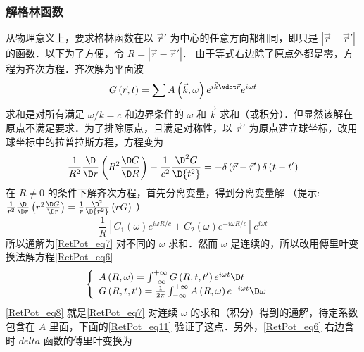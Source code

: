 \subsubsection{解格林函数}  

从物理意义上，要求格林函数在以 $\vec r'$ 为中心的任意方向都相同，即只是 $\left| {\vec r - \vec r'} \right|$ 的函数．以下为了方便，令 $R = \left| {\vec r - \vec r'} \right|$． 
由于等式右边除了原点外都是零，方程为齐次方程．齐次解为平面波
\begin{equation}
G\left( {\vec r,t} \right) = \sum {A\left( {\vec k,\omega } \right){e^{i\vec k \vdot \vec r}}{e^{i\omega t}}} 
\end{equation} 
求和是对所有满足 $\omega /k = c$ 和边界条件的 $\omega$ 和 $\vec k$ 求和（或积分）．但显然该解在原点不满足要求．为了排除原点，且满足对称性，以 $\vec r'$ 为原点建立球坐标，改用球坐标中的拉普拉斯方程，方程变为
\begin{equation}\label{RetPot_eq6}
\frac{1}{{{R^2}}}\frac{\D }{{\D r}}\left( {{R^2}\frac{{\D G}}{{\D R}}} \right) - \frac{1}{{{c^2}}}\frac{{{\D ^2}G}}{{\D {t^2}}} =  - \delta \left( {\vec r - \vec r'} \right)\delta \left( {t - t'} \right)
\end{equation} 
在 $R \ne 0$ 的条件下解齐次方程，首先分离变量，得到分离变量解
（提示: $\frac{1}{{{r^2}}}\frac{\D }{{\D r}}\left( {{r^2}\frac{{\D G}}{{\D r}}} \right) = \frac{1}{r}\frac{{{\D ^2}}}{{\D {r^2}}}\left( {rG} \right)$ ）
\begin{equation}\label{RetPot_eq7}
\frac{1}{R}\left[ {{C_1}\left( \omega  \right){e^{i\omega R/c}} + {C_2}\left( \omega  \right){e^{ - i\omega R/c}}} \right]{e^{i\omega t}}
\end{equation} 
所以通解为\autoref{RetPot_eq7} 对不同的 $\omega$ 求和．然而 $\omega$ 是连续的，所以改用傅里叶变换法解方程\autoref{RetPot_eq6} 
\begin{equation}\label{RetPot_eq8}
\left\{ \begin{array}{l}
A\left( {R,\omega } \right) = \int_{ - \infty }^{ + \infty } {G\left( {R,t,t'} \right){e^{i\omega t}}\D t} {\kern 1pt} {\kern 1pt} {\kern 1pt} {\kern 1pt} {\kern 1pt} {\kern 1pt} {\kern 1pt} {\kern 1pt} \\
G\left( {R,t,t'} \right) = \frac{1}{{2\pi }}\int_{ - \infty }^{ + \infty } {A\left( {R,\omega } \right){e^{ - i\omega t}}\D \omega } {\kern 1pt} {\kern 1pt} {\kern 1pt} {\kern 1pt} {\kern 1pt} {\kern 1pt} {\kern 1pt} {\kern 1pt} 
\end{array} \right.
\end{equation} 
\autoref{RetPot_eq8} 就是\autoref{RetPot_eq7} 对连续 $\omega$ 的求和（积分）得到的通解，待定系数包含在 $A$ 里面，下面的\autoref{RetPot_eq11} 验证了这点．另外，\autoref{RetPot_eq6} 右边含时 $delta$ 函数的傅里叶变换为
